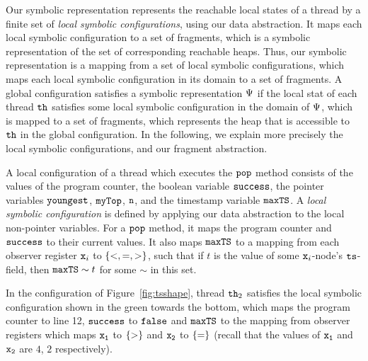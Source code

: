 Our symbolic representation represents the reachable local states of a thread by
a finite set of {\em local symbolic configurations}, using our
data abstraction.
It maps each local symbolic configuration to a set of fragments, which
is a symbolic representation of the set of corresponding reachable heaps.
Thus, our symbolic representation is a mapping from a set of local symbolic
configurations, which maps each local symbolic configuration in its domain
to a set of fragments.
A global configuration satisfies a symbolic representation $\Psi$
if the local stat of each thread ${\tt th}$ satisfies some local symbolic
configuration in the domain of $\Psi$, which is mapped to a set
of fragments, which represents the heap that is accessible to ${\tt th}$ in
the global configuration. In the following, we explain more precisely the
local symbolic configurations, and our fragment abstraction.

A local configuration of a thread which executes the ${\tt pop}$ method consists
of the values of the program counter, the boolean variable ${\tt success}$, the
pointer variables ${\tt youngest}$, ${\tt myTop}$, ${\tt n}$,
and the timestamp variable ${\tt maxTS}$.
A {\em local symbolic configuration} is defined by applying our data abstraction
to the local non-pointer variables.  For a ${\tt pop}$ method, it maps
the program counter and ${\tt success}$ to their current values. It also maps
${\tt maxTS}$ to a mapping from each observer register $\mathtt{x}_i$
to $\left\{<,=,>\right\}$, such that if $t$ is the value of some $\mathtt{x}_i$-node's
$\tt ts$-field, then ${\tt maxTS} \sim t$ for some $\sim$ in this set.

In the configuration of Figure~\ref{fig:tsshape}, thread ${\tt th}_2$
satisfies the local symbolic configuration shown in the green towards the
bottom, 
which maps the program counter to line 12, ${\tt success}$ to ${\tt false}$ and ${\tt maxTS}$ to the mapping from observer registers which maps
$\tt x_1$ to $\left\{>\right\}$ and $\tt x_2$ to $\left\{=\right\}$
(recall that the values of $\tt x_1$ and $\tt x_2$ are $4$, $2$ respectively).



